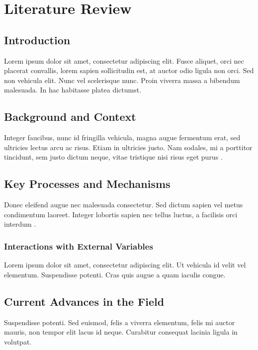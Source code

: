 \fancyfoot[C]{\thepage}

\chapter{Literature Review}

\section{Introduction}
Lorem ipsum dolor sit amet, consectetur adipiscing elit. Fusce aliquet, orci nec placerat convallis, lorem sapien sollicitudin est, at auctor odio ligula non orci. Sed non vehicula elit. Nunc vel scelerisque nunc. Proin viverra massa a bibendum malesuada. In hac habitasse platea dictumst.

\section{Background and Context}
Integer faucibus, nunc id fringilla vehicula, magna augue fermentum erat, sed ultricies lectus arcu ac risus. Etiam in ultricies justo. Nam sodales, mi a porttitor tincidunt, sem justo dictum neque, vitae tristique nisi risus eget purus \citep{sample_reference1}. 

\section{Key Processes and Mechanisms}
Donec eleifend augue nec malesuada consectetur. Sed dictum sapien vel metus condimentum laoreet. Integer lobortis sapien nec tellus luctus, a facilisis orci interdum \citep{sample_reference2}. 

\subsection*{Interactions with External Variables}
Lorem ipsum dolor sit amet, consectetur adipiscing elit. Ut vehicula id velit vel elementum. Suspendisse potenti. Cras quis augue a quam iaculis congue.

\section{Current Advances in the Field}
Suspendisse potenti. Sed euismod, felis a viverra elementum, felis mi auctor mauris, non tempor elit lacus id neque. Curabitur consequat lacinia ligula in volutpat. 

